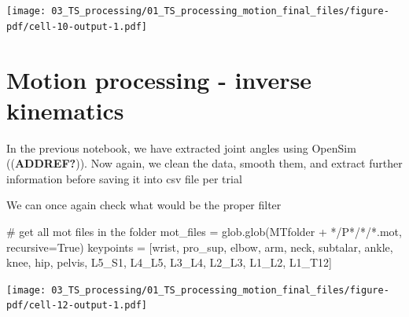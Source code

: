 \documentclass[
  letterpaper,
  DIV=11,
  numbers=noendperiod]{scrreprt}
\newenvironment{Shaded}{\begin{snugshade}}{\end{snugshade}}
\newcommand{\CommentTok}[1]{\textcolor[rgb]{0.37,0.37,0.37}{#1}}
\newcommand{\NormalTok}[1]{\textcolor[rgb]{0.00,0.23,0.31}{#1}}
\newcommand{\OperatorTok}[1]{\textcolor[rgb]{0.37,0.37,0.37}{#1}}
\newcommand{\StringTok}[1]{\textcolor[rgb]{0.13,0.47,0.30}{#1}}
\newcommand{\VariableTok}[1]{\textcolor[rgb]{0.07,0.07,0.07}{#1}}
\begin{document}
\texttt{[image: 03\_TS\_processing/01\_TS\_processing\_motion\_final\_files/figure-pdf/cell-10-output-1.pdf]}


\chapter{Motion processing - inverse
kinematics}\label{motion-processing---inverse-kinematics}

In the previous notebook, we have extracted joint angles using OpenSim
((\textbf{ADDREF?})). Now again, we clean the data, smooth them, and
extract further information before saving it into csv file per trial

We can once again check what would be the proper filter

\begin{Shaded}
\begin{Highlighting}[]
\CommentTok{\# get all mot files in the folder}
\NormalTok{mot\_files }\OperatorTok{=}\NormalTok{ glob.glob(MTfolder }\OperatorTok{+} \StringTok{\textquotesingle{}*/P*/*/*.mot\textquotesingle{}}\NormalTok{, recursive}\OperatorTok{=}\VariableTok{True}\NormalTok{)}
\NormalTok{keypoints }\OperatorTok{=}\NormalTok{ [}\StringTok{\textquotesingle{}wrist\textquotesingle{}}\NormalTok{, }\StringTok{\textquotesingle{}pro\_sup\textquotesingle{}}\NormalTok{, }\StringTok{\textquotesingle{}elbow\textquotesingle{}}\NormalTok{, }\StringTok{\textquotesingle{}arm\textquotesingle{}}\NormalTok{, }\StringTok{\textquotesingle{}neck\textquotesingle{}}\NormalTok{, }\StringTok{\textquotesingle{}subtalar\textquotesingle{}}\NormalTok{, }\StringTok{\textquotesingle{}ankle\textquotesingle{}}\NormalTok{, }\StringTok{\textquotesingle{}knee\textquotesingle{}}\NormalTok{, }\StringTok{\textquotesingle{}hip\textquotesingle{}}\NormalTok{, }\StringTok{\textquotesingle{}pelvis\textquotesingle{}}\NormalTok{, }\StringTok{\textquotesingle{}L5\_S1\textquotesingle{}}\NormalTok{, }\StringTok{\textquotesingle{}L4\_L5\textquotesingle{}}\NormalTok{, }\StringTok{\textquotesingle{}L3\_L4\textquotesingle{}}\NormalTok{, }\StringTok{\textquotesingle{}L2\_L3\textquotesingle{}}\NormalTok{, }\StringTok{\textquotesingle{}L1\_L2\textquotesingle{}}\NormalTok{, }\StringTok{\textquotesingle{}L1\_T12\textquotesingle{}}\NormalTok{]}
\end{Highlighting}
\end{Shaded}

\texttt{[image: 03\_TS\_processing/01\_TS\_processing\_motion\_final\_files/figure-pdf/cell-12-output-1.pdf]}
\end{document}

